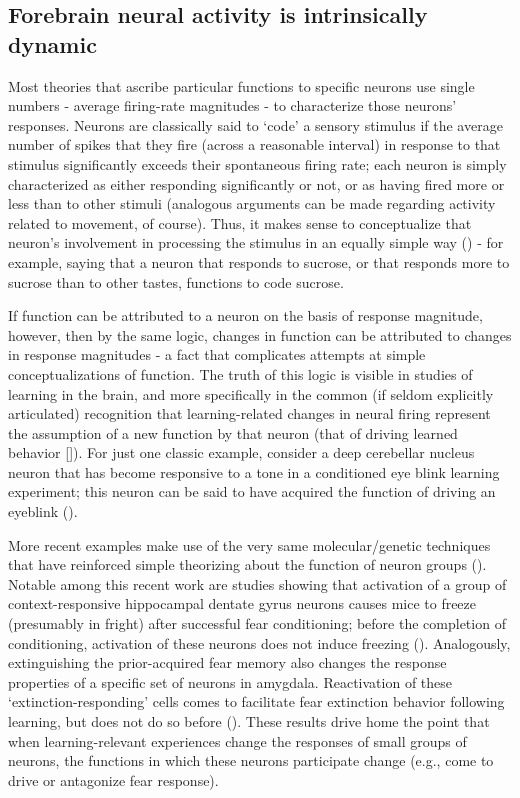 \begin{refsection}
\section{Forebrain neural activity is intrinsically dynamic}
Most theories that ascribe particular functions to specific neurons use single numbers - average firing-rate magnitudes - to characterize those neurons’ responses. Neurons are classically said to ‘code’ a sensory stimulus if the average number of spikes that they fire (across a reasonable interval) in response to that stimulus significantly exceeds their spontaneous firing rate; each neuron is simply characterized as either responding significantly or not, or as having fired more or less than to other stimuli (analogous arguments can be made regarding activity related to movement, of course). Thus, it makes sense to conceptualize that neuron’s involvement in processing the stimulus in an equally simple way (\cite{chen2011a,hubel1995a,lavi2018a,mazurek2014a,steinmetz2019a,wang2018a}) - for example, saying that a neuron that responds to sucrose, or that responds more to sucrose than to other tastes, functions to code sucrose.

If function can be attributed to a neuron on the basis of response magnitude, however, then by the same logic, changes in function can be attributed to changes in response magnitudes - a fact that complicates attempts at simple conceptualizations of function. The truth of this logic is visible in studies of learning in the brain, and more specifically in the common (if seldom explicitly articulated) recognition that learning-related changes in neural firing represent the assumption of a new function by that neuron (that of driving learned behavior [\cite{banerjee2020a,barsy2020a,ross2018a}]). For just one classic example, consider a deep cerebellar nucleus neuron that has become responsive to a tone in a conditioned eye blink learning experiment; this neuron can be said to have acquired the function of driving an eyeblink (\cite{mm2017a}).

More recent examples make use of the very same molecular/genetic techniques that have reinforced simple theorizing about the function of neuron groups (\cite{aqrabawi2020a,butler2020a,josselyn2018a,josselyn2020a,sun2020a}). Notable among this recent work are studies showing that activation of a group of context-responsive hippocampal dentate gyrus neurons causes mice to freeze (presumably in fright) after successful fear conditioning; before the completion of conditioning, activation of these neurons does not induce freezing (\cite{ramirez2013a}). Analogously, extinguishing the prior-acquired fear memory also changes the response properties of a specific set of neurons in amygdala. Reactivation of these ‘extinction-responding’ cells comes to facilitate fear extinction behavior following learning, but does not do so before (\cite{zhang2020a}). These results drive home the point that when learning-relevant experiences change the responses of small groups of neurons, the functions in which these neurons participate change (e.g., come to drive or antagonize fear response).


\end{refsection}
